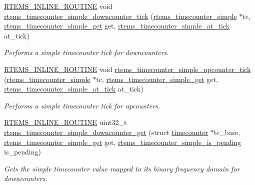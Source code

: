 \begin{DoxyCompactItemize}
\mbox{\hyperlink{group__RTEMSScoreBaseDefs_gac216239df231d5dbd15e3520b0b9313f}{R\+T\+E\+M\+S\+\_\+\+I\+N\+L\+I\+N\+E\+\_\+\+R\+O\+U\+T\+I\+NE}} void \mbox{\hyperlink{group__SAPITimecounter_gaaf2269728a8f160afddd1c097cee60d9}{rtems\+\_\+timecounter\+\_\+simple\+\_\+downcounter\+\_\+tick}} (\mbox{\hyperlink{structrtems__timecounter__simple}{rtems\+\_\+timecounter\+\_\+simple}} $\ast$tc, \mbox{\hyperlink{group__SAPITimecounter_gaf994ec0741af793766d17b42ee91a501}{rtems\+\_\+timecounter\+\_\+simple\+\_\+get}} get, \mbox{\hyperlink{group__SAPITimecounter_ga7d6fb7805c66742ad1e13ca1c2b0ec57}{rtems\+\_\+timecounter\+\_\+simple\+\_\+at\+\_\+tick}} at\+\_\+tick)
\begin{DoxyCompactList}\small\item\em Performs a simple timecounter tick for downcounters. \end{DoxyCompactList}\item 
\mbox{\hyperlink{group__RTEMSScoreBaseDefs_gac216239df231d5dbd15e3520b0b9313f}{R\+T\+E\+M\+S\+\_\+\+I\+N\+L\+I\+N\+E\+\_\+\+R\+O\+U\+T\+I\+NE}} void \mbox{\hyperlink{group__SAPITimecounter_ga1de2d1f9f303848bdf2642895035670c}{rtems\+\_\+timecounter\+\_\+simple\+\_\+upcounter\+\_\+tick}} (\mbox{\hyperlink{structrtems__timecounter__simple}{rtems\+\_\+timecounter\+\_\+simple}} $\ast$tc, \mbox{\hyperlink{group__SAPITimecounter_gaf994ec0741af793766d17b42ee91a501}{rtems\+\_\+timecounter\+\_\+simple\+\_\+get}} get, \mbox{\hyperlink{group__SAPITimecounter_ga7d6fb7805c66742ad1e13ca1c2b0ec57}{rtems\+\_\+timecounter\+\_\+simple\+\_\+at\+\_\+tick}} at\+\_\+tick)
\begin{DoxyCompactList}\small\item\em Performs a simple timecounter tick for upcounters. \end{DoxyCompactList}\item 
\mbox{\hyperlink{group__RTEMSScoreBaseDefs_gac216239df231d5dbd15e3520b0b9313f}{R\+T\+E\+M\+S\+\_\+\+I\+N\+L\+I\+N\+E\+\_\+\+R\+O\+U\+T\+I\+NE}} uint32\+\_\+t \mbox{\hyperlink{group__SAPITimecounter_ga73145202e921ffdda990060007022c56}{rtems\+\_\+timecounter\+\_\+simple\+\_\+downcounter\+\_\+get}} (struct \mbox{\hyperlink{structtimecounter}{timecounter}} $\ast$tc\+\_\+base, \mbox{\hyperlink{group__SAPITimecounter_gaf994ec0741af793766d17b42ee91a501}{rtems\+\_\+timecounter\+\_\+simple\+\_\+get}} get, \mbox{\hyperlink{group__SAPITimecounter_gaaa16abdeb0f4bea8e2d535187ba33589}{rtems\+\_\+timecounter\+\_\+simple\+\_\+is\+\_\+pending}} is\+\_\+pending)
\begin{DoxyCompactList}\small\item\em Gets the simple timecounter value mapped to its binary frequency domain for downcounters. \end{DoxyCompactList}\item 

\end{DoxyCompactItemize}
